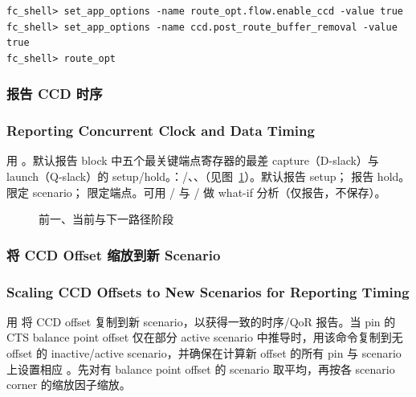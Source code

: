 \begin{lstlisting}
fc_shell> set_app_options -name route_opt.flow.enable_ccd -value true
fc_shell> set_app_options -name ccd.post_route_buffer_removal -value true
fc_shell> route_opt
\end{lstlisting}

\subsubsection{报告 CCD 时序}
\subsubsection*{Reporting Concurrent Clock and Data Timing}

用 。默认报告 block 中五个最关键端点寄存器的最差 capture（D-slack）与 launch（Q-slack）的 setup/hold。：/、、（见图~\ref{fig:cts-ccd-stages}）。默认报告 setup； 报告 hold。 限定 scenario； 限定端点。可用 / 与 / 做 what-if 分析（仅报告，不保存）。

\begin{figure}[htbp]
\centering
{}
\caption{前一、当前与下一路径阶段}
\label{fig:cts-ccd-stages}
\end{figure}

\subsubsection{将 CCD Offset 缩放到新 Scenario}
\subsubsection*{Scaling CCD Offsets to New Scenarios for Reporting Timing}

用  将 CCD offset 复制到新 scenario，以获得一致的时序/QoR 报告。当 pin 的 CTS balance point offset 仅在部分 active scenario 中推导时，用该命令复制到无 offset 的 inactive/active scenario，并确保在计算新 offset 的所有 pin 与 scenario 上设置相应 。先对有 balance point offset 的 scenario 取平均，再按各 scenario corner 的缩放因子缩放。

